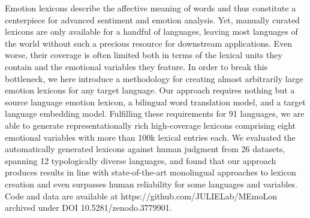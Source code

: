 Emotion lexicons describe the affective meaning of words and thus constitute a centerpiece for advanced sentiment and emotion analysis. Yet, manually curated lexicons are only available for a handful of languages, leaving most languages of the world without such a precious resource for downstream applications. Even worse, their coverage is often limited both in terms of the lexical units they contain and the emotional variables they feature. In order to break this bottleneck, we here introduce a methodology for creating almost arbitrarily large emotion lexicons for any target language. Our approach requires nothing but a source language emotion lexicon, a bilingual word translation model, and a target language embedding model. Fulfilling these requirements for 91 languages, we are able to generate representationally rich high-coverage lexicons comprising eight emotional variables with more than 100k lexical entries each. We evaluated the automatically generated lexicons against human judgment from 26 datasets, spanning 12 typologically diverse languages, and found that our approach produces results in line with state-of-the-art monolingual approaches to lexicon creation and even surpasses human reliability for some languages and variables. Code and data are available at https://github.com/JULIELab/MEmoLon archived under DOI 10.5281/zenodo.3779901.
